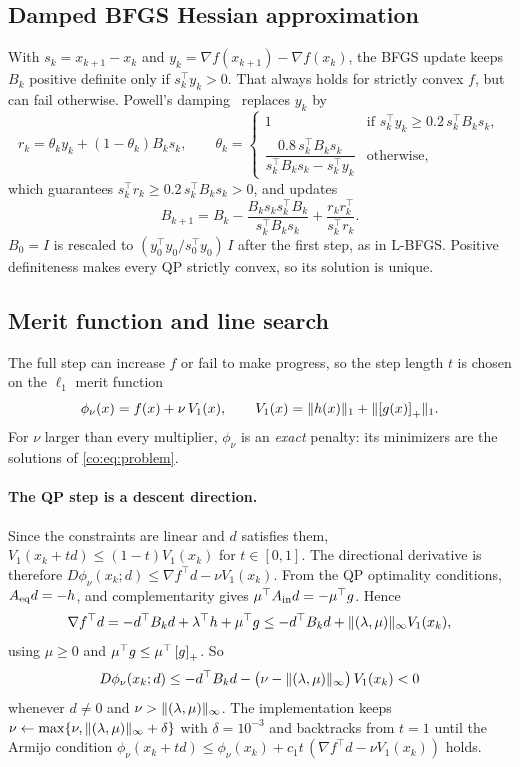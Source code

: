 \subsection{Damped BFGS Hessian approximation}
With $s_k=x_{k+1}-x_k$ and $y_k=\nabla f(x_{k+1})-\nabla f(x_k)$, the BFGS
update keeps $B_k$ positive definite only if $s_k^\top y_k>0$. That always
holds for strictly convex $f$, but can fail otherwise. Powell's damping~\cite{powell1978}
replaces $y_k$ by
\[
  r_k = \theta_k y_k + (1-\theta_k) B_k s_k,\qquad
  \theta_k = \begin{cases}
    1 & \text{if } s_k^\top y_k \ge 0.2\, s_k^\top B_k s_k,\\[2pt]
    \dfrac{0.8\, s_k^\top B_k s_k}{s_k^\top B_k s_k - s_k^\top y_k} & \text{otherwise,}
  \end{cases}
\]
which guarantees $s_k^\top r_k\ge 0.2\,s_k^\top B_k s_k>0$, and updates
\[
  B_{k+1} = B_k - \frac{B_k s_k s_k^\top B_k}{s_k^\top B_k s_k} + \frac{r_k r_k^\top}{s_k^\top r_k}.
\]
$B_0=I$ is rescaled to $(y_0^\top y_0/s_0^\top y_0)\,I$ after the first step, as in
L-BFGS. Positive definiteness makes every QP strictly convex, so its solution
is unique.

\subsection{Merit function and line search}
The full step can increase $f$ or fail to make progress, so the step length
$t$ is chosen on the $\ell_1$ merit function~\cite{han1977}
\[
  \phi_\nu(x) = f(x) + \nu\, V_1(x),\qquad
  V_1(x) = \lVert h(x)\rVert_1 + \lVert \left[g(x)\right]_+\rVert_1 .
\]
For $\nu$ larger than every multiplier, $\phi_\nu$ is an \emph{exact} penalty:
its minimizers are the solutions of \eqref{co:eq:problem}.

\paragraph{The QP step is a descent direction.}
Since the constraints are linear and $d$ satisfies them,
$V_1(x_k+td)\le(1-t)V_1(x_k)$ for $t\in[0,1]$. The directional derivative is
therefore $D\phi_\nu(x_k;d)\le\nabla f^\top d-\nu V_1(x_k)$. From the QP
optimality conditions, $A_{\mathrm{eq}} d=-h$, and complementarity gives $\mu^\top A_{\mathrm{in}} d=-\mu^\top g$. Hence
\[
  \nabla f^\top d = -d^\top B_k d + \lambda^\top h + \mu^\top g
  \le -d^\top B_k d + \lVert (\lambda,\mu)\rVert_\infty V_1(x_k),
\]
using $\mu\ge 0$ and $\mu^\top g\le\mu^\top\left[g\right]_+$. So
\[
  D\phi_\nu(x_k;d) \le -d^\top B_k d - \big(\nu - \lVert (\lambda,\mu)\rVert_\infty\big)\,V_1(x_k) < 0
\]
whenever $d\ne 0$ and $\nu>\lVert (\lambda,\mu)\rVert_\infty$. The implementation keeps
$\nu\gets\max\{\nu,\lVert (\lambda,\mu)\rVert_\infty+\delta\}$ with $\delta=10^{-3}$ and backtracks from $t=1$
until the Armijo condition
$\phi_\nu(x_k+td)\le\phi_\nu(x_k)+c_1 t\,(\nabla f^\top d-\nu V_1(x_k))$ holds.

